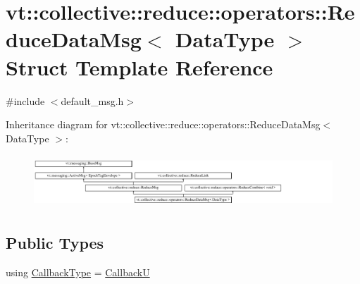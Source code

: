\hypertarget{structvt_1_1collective_1_1reduce_1_1operators_1_1_reduce_data_msg}{}\section{vt\+:\+:collective\+:\+:reduce\+:\+:operators\+:\+:Reduce\+Data\+Msg$<$ Data\+Type $>$ Struct Template Reference}
\label{structvt_1_1collective_1_1reduce_1_1operators_1_1_reduce_data_msg}


{\ttfamily \#include $<$default\+\_\+msg.\+h$>$}

Inheritance diagram for vt\+:\+:collective\+:\+:reduce\+:\+:operators\+:\+:Reduce\+Data\+Msg$<$ Data\+Type $>$\+:\begin{figure}[H]
\begin{center}
\leavevmode
\includegraphics[height=2.001787cm]{structvt_1_1collective_1_1reduce_1_1operators_1_1_reduce_data_msg}
\end{center}
\end{figure}
\subsection*{Public Types}
\begin{DoxyCompactItemize}
\item 
using \hyperlink{structvt_1_1collective_1_1reduce_1_1operators_1_1_reduce_data_msg_a299d0d7f62e0e631ef344e345d89a4f3}{Callback\+Type} = \hyperlink{namespacevt_af79a43a97bc3593fc349f086c874c48e}{CallbackU}
\end{DoxyCompactItemize}
